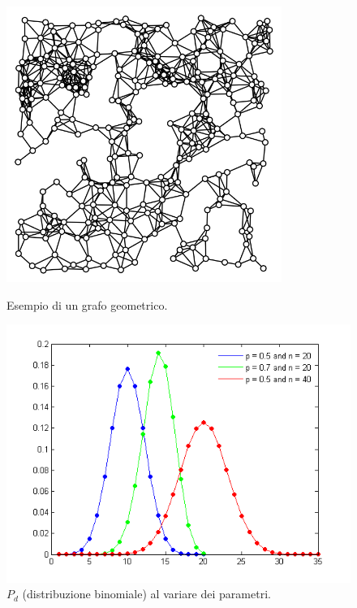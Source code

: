 \begin{figure}[!htbp]
  \centering
  \begin{minipage}[b]{0.4\textwidth}
    \includegraphics[width=0.8\textwidth]{img/geom_graph.png}
    \caption{Esempio di un grafo geometrico.}
  \end{minipage}
  \qquad
  \begin{minipage}[b]{0.4\textwidth}
    \includegraphics[scale=0.5]{img/binomial_dist.png}
    \caption{$P_d$ (distribuzione binomiale) al variare dei parametri.}
  \end{minipage}
\end{figure}

